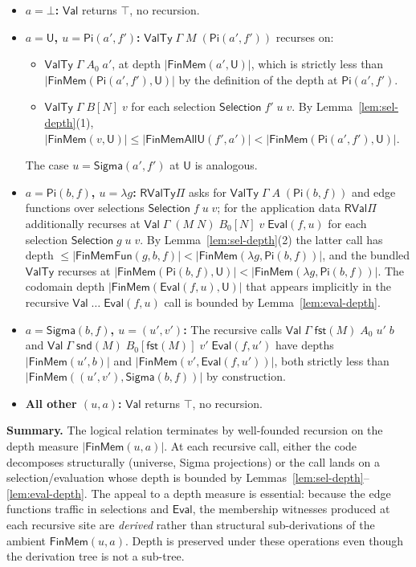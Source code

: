 \documentclass[11pt]{article}
\newcommand{\App}[2]{#1\;#2}
\newcommand{\substone}[2]{#1[#2]}
\newcommand{\U}{\mathsf{U}}
\newcommand{\PiC}[2]{\mathsf{Pi}(#1,#2)}
\newcommand{\SigmaC}[2]{\mathsf{Sigma}(#1,#2)}
\newcommand{\Fst}[1]{\mathsf{fst}(#1)}
\newcommand{\Snd}[1]{\mathsf{snd}(#1)}
\newcommand{\Val}{\mathsf{Val}}
\newcommand{\ValTy}{\mathsf{ValTy}}
\newcommand{\EvalFun}{\mathsf{Eval}}
\newcommand{\Bot}{\bot}
\newcommand{\FunEl}[1]{\lambda #1}
\newcommand{\Selection}{\mathsf{Selection}}
\newcommand{\RValTyPi}{\mathsf{RValTy\Pi}}
\newcommand{\RValPi}{\mathsf{RVal\Pi}}
\newcommand{\depthFM}[2]{|\mathsf{FinMem}(#1,#2)|}
\newcommand{\depthAllU}[2]{|\mathsf{FinMemAllU}(#1,#2)|}
\newcommand{\depthFun}[3]{|\mathsf{FinMemFun}(#1,#2,#3)|}
\begin{document}
\begin{itemize}
\item \textbf{$a = \Bot$:} $\Val$ returns $\top$, no recursion.

\item \textbf{$a = \U$, $u = \PiC{a'}{f'}$:}
  $\ValTy\;\Gamma\;M\;(\PiC{a'}{f'})$ recurses on:
  \begin{itemize}
  \item $\ValTy\;\Gamma\;A_0\;a'$, at depth $\depthFM{a'}{\U}$, which
    is strictly less than $\depthFM{\PiC{a'}{f'}}{\U}$ by the
    definition of the depth at $\PiC{a'}{f'}$.
  \item $\ValTy\;\Gamma\;\substone{B}{N}\;v$ for each selection
    $\Selection\;f'\;u\;v$.  By Lemma~\ref{lem:sel-depth}(1),
    $\depthFM{v}{\U} \leq \depthAllU{f'}{a'}
     < \depthFM{\PiC{a'}{f'}}{\U}$.
  \end{itemize}
  The case $u = \SigmaC{a'}{f'}$ at $\U$ is analogous.

\item \textbf{$a = \PiC{b}{f}$, $u = \FunEl{g}$:}
  $\RValTyPi$ asks for $\ValTy\;\Gamma\;A\;(\PiC{b}{f})$ and edge
  functions over selections $\Selection\;f\;u\;v$; for the application
  data $\RValPi$ additionally recurses at
  $\Val\;\Gamma\;(\App{M}{N})\;\substone{B_0}{N}\;v\;\EvalFun(f,u)$ for
  each selection $\Selection\;g\;u\;v$.  By
  Lemma~\ref{lem:sel-depth}(2) the latter call has depth
  $\leq \depthFun{g}{b}{f} < \depthFM{\FunEl{g}}{\PiC{b}{f}}$, and the
  bundled $\ValTy$ recurses at
  $\depthFM{\PiC{b}{f}}{\U} < \depthFM{\FunEl{g}}{\PiC{b}{f}}$.  The
  codomain depth $\depthFM{\EvalFun(f,u)}{\U}$ that appears implicitly
  in the recursive $\Val\;\ldots\;\EvalFun(f,u)$ call is bounded by
  Lemma~\ref{lem:eval-depth}.

\item \textbf{$a = \SigmaC{b}{f}$, $u = (u',v')$:}
  The recursive calls $\Val\;\Gamma\;\Fst{M}\;A_0\;u'\;b$ and
  $\Val\;\Gamma\;\Snd{M}\;\substone{B_0}{\Fst{M}}\;v'\;\EvalFun(f,u')$
  have depths $\depthFM{u'}{b}$ and $\depthFM{v'}{\EvalFun(f,u')}$,
  both strictly less than $\depthFM{(u',v')}{\SigmaC{b}{f}}$ by
  construction.

\item \textbf{All other $(u,a)$:} $\Val$ returns $\top$, no recursion.
\end{itemize}

\medskip\noindent\textbf{Summary.}
The logical relation terminates by well-founded recursion on the depth
measure $\depthFM{u}{a}$.  At each recursive call, either the code
decomposes structurally (universe, Sigma projections) or the call
lands on a selection/evaluation whose depth is bounded by
Lemmas~\ref{lem:sel-depth}--\ref{lem:eval-depth}.  The appeal to a
depth measure is essential: because the edge functions traffic in
selections and $\EvalFun$, the membership witnesses produced at each
recursive site are \emph{derived} rather than structural
sub-derivations of the ambient $\mathsf{FinMem}(u,a)$.  Depth is
preserved under these operations even though the derivation tree is
not a sub-tree.
\end{document}

